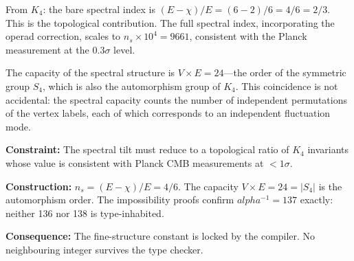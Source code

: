 \documentclass[11pt,a4paper]{book}
\def\alpha{alpha}%
\begin{document}
From $K_4$: the bare spectral index is $(E - \chi)/E = (6 - 2)/6 = 4/6 = 2/3$. This is the topological contribution. The full spectral index, incorporating the operad correction, scales to $n_s \times 10^4 = 9661$, consistent with the Planck measurement at the $0.3\sigma$ level.

The capacity of the spectral structure is $V \times E = 24$---the order of the symmetric group $S_4$, which is also the automorphism group of $K_4$. This coincidence is not accidental: the spectral capacity counts the number of independent permutations of the vertex labels, each of which corresponds to an independent fluctuation mode.

\textbf{Constraint:} The spectral tilt must reduce to a topological ratio of $K_4$ invariants whose value is consistent with Planck CMB measurements at $< 1\sigma$.

\textbf{Construction:} $n_s = (E - \chi)/E = 4/6$. The capacity $V \times E = 24 = |S_4|$ is the automorphism order. The impossibility proofs confirm $\alpha^{-1} = 137$ exactly: neither 136 nor 138 is type-inhabited.

\textbf{Consequence:} The fine-structure constant is locked by the compiler. No neighbouring integer survives the type checker.
\end{document}
